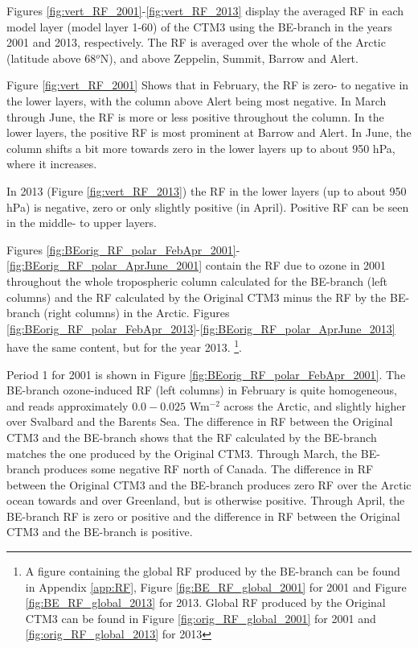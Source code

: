 \medskip

Figures \ref{fig:vert_RF_2001}-\ref{fig:vert_RF_2013} display the averaged RF in each model layer (model layer 1-60) of the CTM3 using the BE-branch in the years 2001 and 2013, respectively. The RF is averaged over the whole of the Arctic (latitude above 68$^o$N), and above Zeppelin, Summit, Barrow and Alert. 

\medskip

Figure \ref{fig:vert_RF_2001} Shows that in February, the RF is zero- to negative in the lower layers, with the column above Alert being most negative. In March through June, the RF is more or less positive throughout the column. In the lower layers, the positive RF is most prominent at Barrow and Alert. In June, the column shifts a bit more towards zero in the lower layers up to about 950 hPa, where it increases. 


\medskip

In 2013 (Figure \ref{fig:vert_RF_2013}) the RF in the lower layers (up to about 950 hPa) is negative, zero or only slightly positive (in April). Positive RF can be seen in the middle- to upper layers. 




\medskip


Figures \ref{fig:BEorig_RF_polar_FebApr_2001}-\ref{fig:BEorig_RF_polar_AprJune_2001} contain the RF due to ozone in 2001 throughout the whole tropospheric column calculated for the BE-branch (left columns) and the RF calculated by the Original CTM3 minus the RF by the BE-branch (right columns) in the Arctic. Figures \ref{fig:BEorig_RF_polar_FebApr_2013}-\ref{fig:BEorig_RF_polar_AprJune_2013} have the same content, but for the year 2013. \footnote{A figure containing the global RF produced by the BE-branch can be found in Appendix \ref{app:RF}, Figure \ref{fig:BE_RF_global_2001} for 2001 and Figure \ref{fig:BE_RF_global_2013} for 2013. Global RF produced by the Original CTM3 can be found in Figure \ref{fig:orig_RF_global_2001} for 2001 and \ref{fig:orig_RF_global_2013} for 2013}. 
\medskip 

Period 1 for 2001 is shown in Figure \ref{fig:BEorig_RF_polar_FebApr_2001}. The BE-branch ozone-induced RF (left columns) in February is quite homogeneous, and reads approximately $0.0-0.025$ Wm$^{-2}$ across the Arctic, and slightly higher over Svalbard and the Barents Sea. The difference in RF between the Original CTM3 and the BE-branch shows that the RF calculated by the BE-branch matches the one produced by the Original CTM3. Through March, the BE-branch produces some negative RF north of Canada. The difference in RF between the Original CTM3 and the BE-branch produces zero RF over the Arctic ocean towards and over Greenland, but is otherwise positive. Through April, the BE-branch RF is zero or positive and the difference in RF between the Original CTM3 and the BE-branch is positive.


